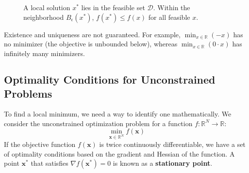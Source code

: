 \begin{figure}[h]
    \centering
    \caption{A local solution $x^*$ lies in the feasible set $\mathcal{D}$. Within the neighborhood $B_\epsilon(x^*)$, $f(x^*) \le f(x)$ for all feasible $x$.}
    \label{fig:local-solution}
\end{figure}

Existence and uniqueness are not guaranteed. For example, $\min_{x \in \mathbb{R}} (-x)$ has no minimizer (the objective is unbounded below), whereas $\min_{x \in \mathbb{R}} (0\cdot x)$ has infinitely many minimizers.

\subsection{Optimality Conditions for Unconstrained Problems}
To find a local minimum, we need a way to identify one mathematically. We consider the unconstrained optimization problem for a function $f: \mathbb{R}^N \to \mathbb{R}$:
\begin{equation}
    \min_{\mathbf{x} \in \mathbb{R}^N} f(\mathbf{x})
\end{equation}
If the objective function $f(\mathbf{x})$ is twice continuously differentiable, we have a set of optimality conditions based on the gradient and Hessian of the function. A point $\mathbf{x}^*$ that satisfies $\nabla f(\mathbf{x}^*) = 0$ is known as a \textbf{stationary point}.

